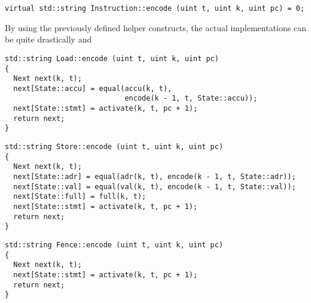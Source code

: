 
\begin{lstlisting}[style=c++]
virtual std::string Instruction::encode (uint t, uint k, uint pc) = 0;
\end{lstlisting}


\noindent
By using the previously defined helper constructs, the actual implementations can be  quite drastically and %

\newpage

\begin{lstlisting}[style=c++, style=encode]
std::string Load::encode (uint t, uint k, uint pc)
{
  Next next(k, t);
  next[State::accu] = equal(accu(k, t),
                            encode(k - 1, t, State::accu));
  next[State::stmt] = activate(k, t, pc + 1);
  return next;
}
\end{lstlisting}


\begin{lstlisting}[style=c++, style=encode]
std::string Store::encode (uint t, uint k, uint pc)
{
  Next next(k, t);
  next[State::adr] = equal(adr(k, t), encode(k - 1, t, State::adr));
  next[State::val] = equal(val(k, t), encode(k - 1, t, State::val));
  next[State::full] = full(k, t);
  next[State::stmt] = activate(k, t, pc + 1);
  return next;
}
\end{lstlisting}


\begin{lstlisting}[style=c++, style=encode]
std::string Fence::encode (uint t, uint k, uint pc)
{
  Next next(k, t);
  next[State::stmt] = activate(k, t, pc + 1);
  return next;
}
\end{lstlisting}

